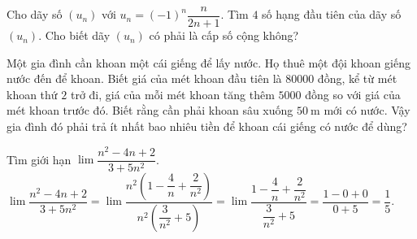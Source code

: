 \begin{bt}%
	Cho dãy số $\left(u_n\right)$ với $u_n=(-1)^n \dfrac{n}{2 n+1}$. Tìm $4$ số hạng đầu tiên của dãy số $\left(u_n\right)$. Cho biết dãy $\left(u_n\right)$ có phải là cấp số cộng không?
\end{bt}

\begin{bt}%
	Một gia đình cần khoan một cái giếng để lấy nước. Họ thuê một đội khoan giếng nước đến để khoan. Biết giá của mét khoan đầu tiên là $80000$ đồng, kể từ mét khoan thứ $2$ trở đi, giá của mỗi mét khoan tăng thêm $5000$ đồng so với giá của mét khoan trước đó. Biết rằng cần phải khoan sâu xuống $50 \mathrm{~m}$ mới có nước. Vậy gia đình đó phải trả ít nhất bao nhiêu tiền để khoan cái giếng có nước để dùng?
\end{bt}

\begin{bt}%
	Tìm giới hạn $\lim\dfrac{n^2-4n+2}{3+5n^2}$.
	\loigiai
	{
		$\lim\dfrac{n^2-4n+2}{3+5n^2}=\lim\dfrac{n^2\left(1-\dfrac{4}{n}+\dfrac{2}{n^2}\right)}{n^2\left(\dfrac{3}{n^2}+5\right)}=\lim\dfrac{1-\dfrac{4}{n}+\dfrac{2}{n^2}}{\dfrac{3}{n^2}+5}=\dfrac{1-0+0}{0+5}=\dfrac{1}{5}$.
	}
\end{bt}

